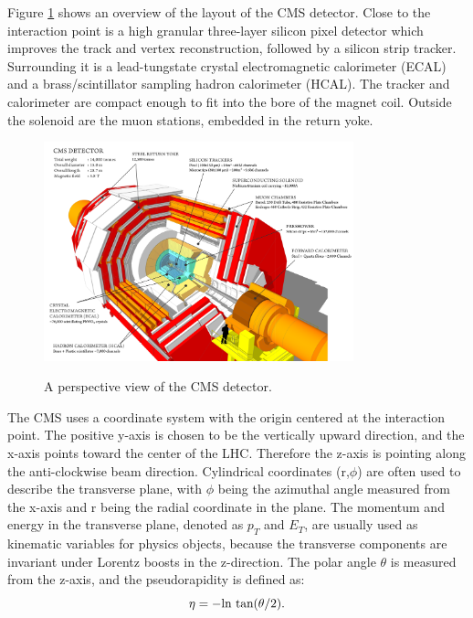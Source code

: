 \documentclass[thesis.tex]{subfiles}
\begin{document}
Figure \ref{fig:cmslayout} shows an overview of the layout of the CMS detector. Close to the interaction point is a high granular three-layer silicon pixel detector which improves the track and vertex reconstruction, followed by a silicon strip tracker. Surrounding it is a lead-tungstate crystal electromagnetic calorimeter (ECAL) and a brass/scintillator sampling hadron calorimeter (HCAL). The tracker and calorimeter are compact enough to fit into the bore of the magnet coil. Outside the solenoid are the muon stations, embedded in the return yoke. 

\begin{figure}[hbt]
	\centering
	\includegraphics[width=0.8\textwidth]{plot/cms_layout.png}
	\label{fig:cmslayout}
	\caption{A perspective view of the CMS detector.}
\end{figure}

The CMS uses a coordinate system with the origin centered at the interaction point. The positive y-axis is chosen to be the vertically upward direction, and the x-axis points toward the center of the LHC. Therefore the z-axis is pointing along the anti-clockwise beam direction. Cylindrical coordinates (r,$\phi$) are often used to describe the transverse plane, with $\phi$ being the azimuthal angle measured from the x-axis and r being the radial coordinate in the plane. The momentum and energy in the transverse plane, denoted as $p_T$ and $E_T$, are usually used as kinematic variables for physics objects, because the transverse components are invariant under Lorentz boosts in the z-direction. The polar angle $\theta$ is measured from the z-axis, and the pseudorapidity is defined as: 
\begin{equation}
	\centering
       \eta = -\text{ln tan}(\theta/2).
\end{equation}
\end{document}
